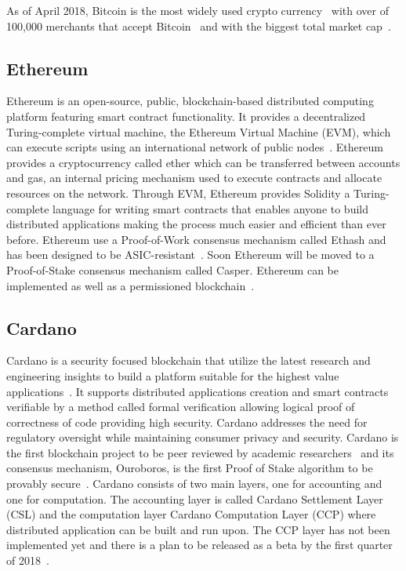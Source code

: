 As of April 2018, Bitcoin is the most widely used crypto currency~\cite{10.1007/978-3-642-39884-1_2} with over of 100,000 merchants that accept Bitcoin~\cite{btc_merchants} and with the biggest total market cap~\cite{btc_cap}.

\subsection{Ethereum}\label{blockchain:impl:ethereum}

Ethereum is an open-source, public, blockchain-based distributed computing platform featuring smart contract functionality.
It provides a decentralized Turing-complete virtual machine, the Ethereum Virtual Machine (EVM), which can execute scripts using an
international network of public nodes~\cite{ethereum_yellowpaper}. Ethereum provides a cryptocurrency called ether which can be transferred between accounts and gas,
an internal pricing mechanism used to execute contracts and allocate resources on the network. Through EVM, Ethereum provides Solidity a
Turing-complete language for writing smart contracts that enables anyone to build distributed applications making the process much easier and efficient than ever before.
Ethereum use a Proof-of-Work consensus mechanism called Ethash and has been designed to be ASIC-resistant~\cite{ethash}.
Soon Ethereum will be moved to a Proof-of-Stake consensus mechanism called Casper. Ethereum can be implemented as well as a permissioned blockchain~\cite{consortium_chain_development,quorum}.

\subsection{Cardano}\label{blockchain:impl:cardano}

Cardano is a security focused blockchain that utilize the latest research and engineering insights to build a platform suitable for
the highest value applications~\cite{cardano_site}. It supports distributed applications creation and smart contracts verifiable by a method called formal
verification allowing logical proof of correctness of code providing high security. Cardano addresses the need for regulatory oversight while
maintaining consumer privacy and security. Cardano is the first blockchain project to be peer reviewed by academic researchers~\cite{cardano_site} and its consensus
mechanism, Ouroboros, is the first Proof of Stake algorithm to be provably secure~\cite{Kiayias2017}.
Cardano consists of two main layers, one for accounting and one for computation. The accounting layer is called Cardano Settlement Layer (CSL)
and the computation layer Cardano Computation Layer (CCP) where distributed application can be built and run upon. The CCP layer has not been
implemented yet and there is a plan to be released as a beta by the first quarter of 2018~\cite{cardano_parsons}.

